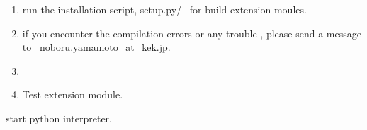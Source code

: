 \documentclass[a4paper,12pt,dvipdfmx]{sphinxhowto}
\begin{document}
\begin{enumerate}
\begin{sphinxVerbatim}[commandchars=\\\{\}]
\end{sphinxVerbatim}

\begin{sphinxVerbatim}[commandchars=\\\{\}]
\end{sphinxVerbatim}

\item {} 
\sphinxAtStartPar
run the installation script, setup.py/  for build extension moules.

\begin{sphinxVerbatim}[commandchars=\\\{\}]
  
\end{sphinxVerbatim}

\item {} 
\sphinxAtStartPar
if you encounter the compilation errors or any trouble , please send
a message to  noboru.yamamoto\_at\_kek.jp.

\item {} 

\begin{sphinxVerbatim}[commandchars=\\\{\}]
  
\end{sphinxVerbatim}

\item {} 
\sphinxAtStartPar
Test extension module.

\end{enumerate}

\sphinxAtStartPar
start python interpreter.

\begin{sphinxVerbatim}[commandchars=\\\{\}]
\end{sphinxVerbatim}
\end{document}
